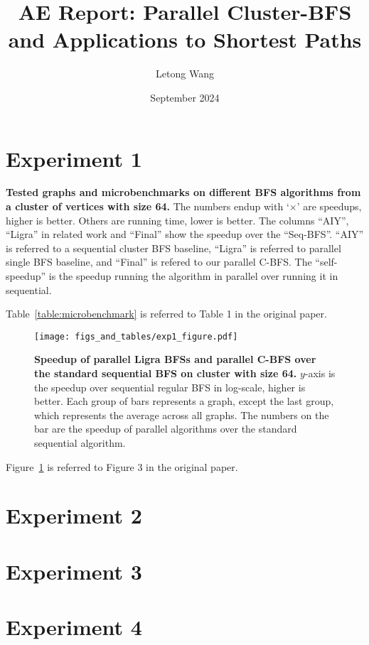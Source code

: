 \documentclass{article}
\title{AE Report: Parallel Cluster-BFS and Applications to Shortest Paths}
\author{Letong Wang}
\date{September 2024}
\begin{document}
\maketitle

\section{Experiment 1}
\begin{table}[htbp]
  \centering
  \footnotesize
  
  \caption{\small\textbf{
    Tested graphs and microbenchmarks on different BFS algorithms from a cluster of vertices with size 64. 
  }
  The numbers endup with `$\times$' are speedups, higher is better. Others are running time, lower is better. The columns ``AIY'', ``Ligra'' in related work and ``Final'' show the speedup over the ``Seq-BFS''. ``AIY'' is referred to a sequential cluster BFS baseline, ``Ligra'' is referred to parallel single BFS baseline, and ``Final'' is refered to our parallel C-BFS.  The ``self-speedup'' is the speedup running the algorithm in parallel over running it in sequential. 
  \label{table:microbenchmark}
  }
\end{table}
Table~\ref{table:microbenchmark} is referred to Table 1 in the original paper.

\begin{figure}[htbp]
  \centering
  \texttt{[image: figs\_and\_tables/exp1\_figure.pdf]}
  \caption{\small\textbf{Speedup of parallel Ligra BFSs and parallel C-BFS over the standard sequential BFS on cluster with size 64.} $y$-axis is the speedup over sequential regular BFS in log-scale, higher is better. Each group of bars represents a graph, except the last group, which represents the average across all graphs. The numbers on the bar are the speedup of parallel algorithms over the standard sequential algorithm.  
  \label{fig:par_compare}
  }
\end{figure} 
Figure~\ref{fig:par_compare} is referred to Figure 3 in the original paper.

\section{Experiment 2}
\section{Experiment 3}
\section{Experiment 4}
\end{document}
